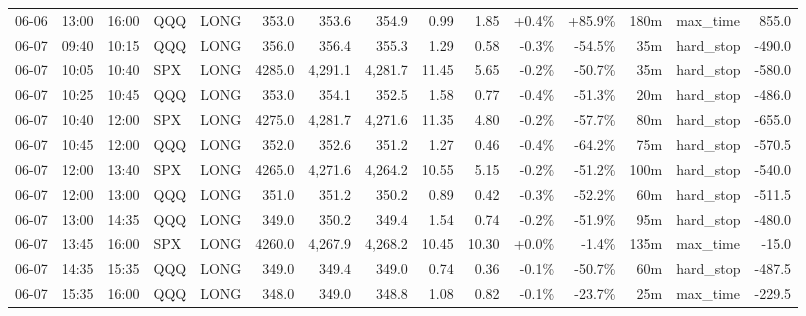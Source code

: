 \documentclass[11pt,a4paper,twoside]{article}
\begin{document}
\begin{landscape}
\begin{center}
\begin{longtable}{>{\color{txtmain}}l l l l l r r r r r r r r >{\color{txtmain}}l r}
06-06 & 13:00 & 16:00 & QQQ & LONG & 353.0 & 353.6 & 354.9 & 0.99 & 1.85 & \textcolor{wingreen}{+0.4\%} & \textcolor{wingreen}{+85.9\%} & 180m & max\_time & \textcolor{wingreen}{855.0} \\
06-07 & 09:40 & 10:15 & QQQ & LONG & 356.0 & 356.4 & 355.3 & 1.29 & 0.58 & \textcolor{lossred}{-0.3\%} & \textcolor{lossred}{-54.5\%} & 35m & hard\_stop & \textcolor{lossred}{-490.0} \\
06-07 & 10:05 & 10:40 & SPX & LONG & 4285.0 & 4,291.1 & 4,281.7 & 11.45 & 5.65 & \textcolor{lossred}{-0.2\%} & \textcolor{lossred}{-50.7\%} & 35m & hard\_stop & \textcolor{lossred}{-580.0} \\
06-07 & 10:25 & 10:45 & QQQ & LONG & 353.0 & 354.1 & 352.5 & 1.58 & 0.77 & \textcolor{lossred}{-0.4\%} & \textcolor{lossred}{-51.3\%} & 20m & hard\_stop & \textcolor{lossred}{-486.0} \\
06-07 & 10:40 & 12:00 & SPX & LONG & 4275.0 & 4,281.7 & 4,271.6 & 11.35 & 4.80 & \textcolor{lossred}{-0.2\%} & \textcolor{lossred}{-57.7\%} & 80m & hard\_stop & \textcolor{lossred}{-655.0} \\
06-07 & 10:45 & 12:00 & QQQ & LONG & 352.0 & 352.6 & 351.2 & 1.27 & 0.46 & \textcolor{lossred}{-0.4\%} & \textcolor{lossred}{-64.2\%} & 75m & hard\_stop & \textcolor{lossred}{-570.5} \\
06-07 & 12:00 & 13:40 & SPX & LONG & 4265.0 & 4,271.6 & 4,264.2 & 10.55 & 5.15 & \textcolor{lossred}{-0.2\%} & \textcolor{lossred}{-51.2\%} & 100m & hard\_stop & \textcolor{lossred}{-540.0} \\
06-07 & 12:00 & 13:00 & QQQ & LONG & 351.0 & 351.2 & 350.2 & 0.89 & 0.42 & \textcolor{lossred}{-0.3\%} & \textcolor{lossred}{-52.2\%} & 60m & hard\_stop & \textcolor{lossred}{-511.5} \\
06-07 & 13:00 & 14:35 & QQQ & LONG & 349.0 & 350.2 & 349.4 & 1.54 & 0.74 & \textcolor{lossred}{-0.2\%} & \textcolor{lossred}{-51.9\%} & 95m & hard\_stop & \textcolor{lossred}{-480.0} \\
06-07 & 13:45 & 16:00 & SPX & LONG & 4260.0 & 4,267.9 & 4,268.2 & 10.45 & 10.30 & \textcolor{wingreen}{+0.0\%} & \textcolor{lossred}{-1.4\%} & 135m & max\_time & \textcolor{lossred}{-15.0} \\
06-07 & 14:35 & 15:35 & QQQ & LONG & 349.0 & 349.4 & 349.0 & 0.74 & 0.36 & \textcolor{lossred}{-0.1\%} & \textcolor{lossred}{-50.7\%} & 60m & hard\_stop & \textcolor{lossred}{-487.5} \\
06-07 & 15:35 & 16:00 & QQQ & LONG & 348.0 & 349.0 & 348.8 & 1.08 & 0.82 & \textcolor{lossred}{-0.1\%} & \textcolor{lossred}{-23.7\%} & 25m & max\_time & \textcolor{lossred}{-229.5} \\

\end{longtable}
\end{center}
\end{landscape}
\end{document}
